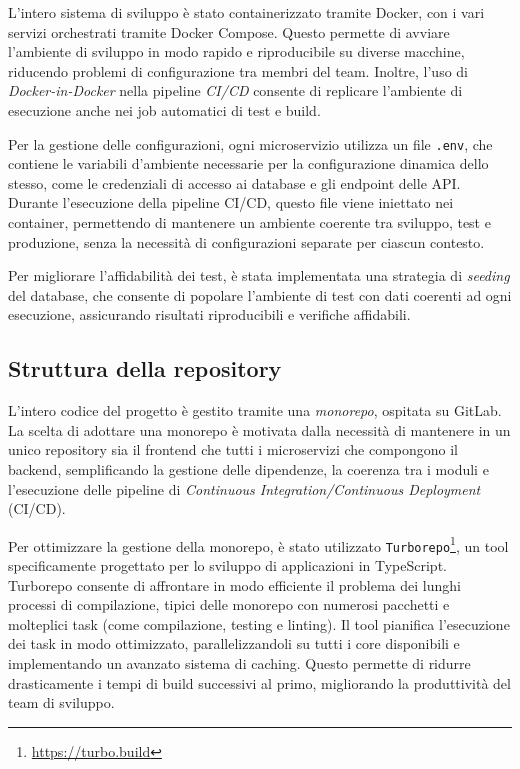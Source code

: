 L'intero sistema di sviluppo è stato containerizzato tramite Docker, con i vari servizi orchestrati tramite Docker Compose. Questo permette di avviare l’ambiente di sviluppo in modo rapido e riproducibile su diverse macchine, riducendo problemi di configurazione tra membri del team. Inoltre, l'uso di \textit{Docker-in-Docker} nella pipeline \textit{CI/CD} consente di replicare l’ambiente di esecuzione anche nei job automatici di test e build.

Per la gestione delle configurazioni, ogni microservizio utilizza un file \texttt{.env}, che contiene le variabili d’ambiente necessarie per la configurazione dinamica dello stesso, come le credenziali di accesso ai database e gli endpoint delle API. Durante l’esecuzione della pipeline CI/CD, questo file viene iniettato nei container, permettendo di mantenere un ambiente coerente tra sviluppo, test e produzione, senza la necessità di configurazioni separate per ciascun contesto.

Per migliorare l'affidabilità dei test, è stata implementata una strategia di \textit{seeding} del database, che consente di popolare l’ambiente di test con dati coerenti ad ogni esecuzione, assicurando risultati riproducibili e verifiche affidabili.

\subsection{Struttura della repository}
L'intero codice del progetto è gestito tramite una \textit{monorepo}, ospitata su GitLab. La scelta di adottare una monorepo è motivata dalla necessità di mantenere in un unico repository sia il frontend che tutti i microservizi che compongono il backend, semplificando la gestione delle dipendenze, la coerenza tra i moduli e l'esecuzione delle pipeline di \textit{Continuous Integration/Continuous Deployment} (CI/CD).

Per ottimizzare la gestione della monorepo, è stato utilizzato \texttt{Turborepo}\footnote{\url{https://turbo.build}}, un tool specificamente progettato per lo sviluppo di applicazioni in TypeScript. Turborepo consente di affrontare in modo efficiente il problema dei lunghi processi di compilazione, tipici delle monorepo con numerosi pacchetti e molteplici task (come compilazione, testing e linting). Il tool pianifica l'esecuzione dei task in modo ottimizzato, parallelizzandoli su tutti i core disponibili e implementando un avanzato sistema di caching. Questo permette di ridurre drasticamente i tempi di build successivi al primo, migliorando la produttività del team di sviluppo.

